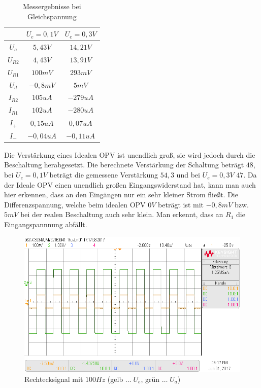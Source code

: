 \documentclass[12pt,a4paper,titlepage]{article}
\begin{document}
\begin{table}[H]
  \centering
  \begin{tabular}{c|c|c}
    & $U_e = 0,1V$ & $U_e = 0,3V$\\
    \hline
    $U_a$ & $5,43V$ & $14,21V$ \\
    \hline
    $U_{R2}$ & $4,43V$ & $13,91V$ \\
    \hline
    $U_{R1}$ & $100mV$ & $293mV$\\
    \hline
    $U_d$ & $-0,8mV$ & $5mV$ \\
    \hline
    $I_{R2}$ & $105uA$ & $-279uA$ \\
    \hline
    $I_{R1}$ & $102uA$ & $-280uA$ \\
    \hline
    $I_{+}$ & $0,15uA$ & $0,07uA$ \\
    \hline
    $I_{-}$ & $-0,04uA$ & $-0,11uA$ \\
  \end{tabular}
  \caption{Messergebnisse bei Gleichspannung}
\end{table}

\noindent Die Verstärkung eines Idealen OPV ist unendlich groß, sie wird jedoch durch die Beschaltung herabgesetzt. Die berechnete Verstärkung der Schaltung beträgt $48$, bei $U_e = 0,1V$ beträgt die gemessene Verstärkung $54,3$ und bei $U_e = 0,3V$ $47$. Da der Ideale OPV einen unendlich großen Eingangswiderstand hat, kann man auch hier erkennen, dass an den Eingängen nur ein sehr kleiner Strom fließt. Die Differenzspannung, welche beim idealen OPV $0V$ beträgt ist mit $-0,8mV$ bzw. $5mV$ bei der realen Beschaltung auch sehr klein. Man erkennt, dass an $R_1$ die Eingangspannnung abfällt. %

\begin{figure}[H]
  \centering
  \includegraphics[width=150mm]{scope_0.png}
  \caption{Rechtecksignal mit $100Hz$ (gelb $\hdots\;U_e$, grün $\hdots\;U_a$)}
\end{figure}
\end{document}
